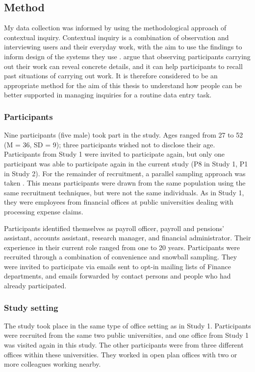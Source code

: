 \subsection{Method}
My data collection was informed by using the methodological approach of contextual inquiry. Contextual inquiry is a combination of observation and interviewing users and their everyday work, with the aim to use the findings to inform design of the systems they use \citep{Holtzblatt2014}.
\citet{Holtzblatt2014} argue that observing participants carrying out their work can reveal concrete details, and it can help participants to recall past situations of carrying out work. It is therefore considered to be an appropriate method for the aim of this thesis to understand how people can be better supported in managing inquiries for a routine data entry task.

\subsubsection{Participants}
Nine participants (five male) took part in the study. Ages ranged from 27 to 52 (M = 36, SD = 9); three participants wished not to disclose their age. Participants from Study 1 were invited to participate again, but only one participant was able to participate again in the current study (P8 in Study 1, P1 in Study 2).  For the remainder of recruitment, a parallel sampling approach was taken \citep{Onwuegbuzie2008}. This means participants were drawn from the same population using the same recruitment techniques, but were not the same individuals. As in Study 1, they were employees from financial offices at public universities dealing with processing expense claims. 

Participants identified themselves as payroll officer, payroll and pensions’ assistant, accounts assistant, research manager, and financial administrator. Their experience in their current role ranged from one to 20 years. Participants were recruited through a combination of convenience and snowball sampling. They were invited to participate via emails sent to opt-in mailing lists of Finance departments, and emails forwarded by contact persons and people who had already participated.  

\subsubsection{Study setting}
The study took place in the same type of office setting as in Study 1. Participants were recruited from the same two public universities, and one office from Study 1 was visited again in this study. The other participants were from three different offices within these universities. They worked in open plan offices with two or more colleagues working nearby. 

